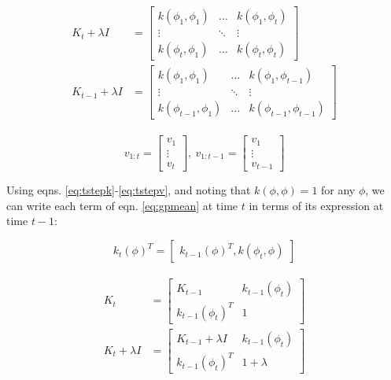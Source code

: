 \documentclass[letterpaper, 10 pt, conference]{ieeeconf}
\begin{document}
\begin{align}
\begin{split}
    K_t+\lambda I &= 
    \begin{bmatrix}
        k(\phi_1,\phi_1)&\hdots&k(\phi_1,\phi_t) \\
        \vdots & \ddots & \vdots \\
        k(\phi_t,\phi_1)&\hdots&k(\phi_t,\phi_t)
    \end{bmatrix}
    \\
    K_{t-1}+\lambda I &= 
    \begin{bmatrix}
        k(\phi_1,\phi_1)&\hdots&k(\phi_1,\phi_{t-1}) \\
        \vdots & \ddots & \vdots \\
        k(\phi_{t-1},\phi_1)&\hdots&k(\phi_{t-1},\phi_{t-1})
    \end{bmatrix}
    \label{eq:tstepK}
\end{split}
\end{align}

\begin{equation}
    v_{1:t} = 
    \begin{bmatrix}
        v_1 \\
        \vdots \\
        v_t
    \end{bmatrix}
    ,\ 
    v_{1:t-1} = 
    \begin{bmatrix}
        v_1 \\
        \vdots \\
        v_{t-1}
    \end{bmatrix}
    \label{eq:tstepv}
\end{equation}
\smallskip

Using eqns. \ref{eq:tstepk}-\ref{eq:tstepv}, and noting that $k(\phi,\phi)=1$ for any $\phi$, we can write each term of eqn. \ref{eq:gpmean} at time $t$ in terms of its expression at time $t-1$:

\begin{equation}
    k_t(\phi)^T=
    \begin{bmatrix}
        k_{t-1}(\phi)^T, k(\phi_t,\phi)
    \end{bmatrix}
\end{equation}

\begin{align}
\begin{split}
    K_t &=
    \begin{bmatrix}
        K_{t-1} & k_{t-1}(\phi_t) \\
        k_{t-1}(\phi_t)^T & 1
    \end{bmatrix}
    \\
    K_t+\lambda I &=
    \begin{bmatrix}
        K_{t-1}+\lambda I & k_{t-1}(\phi_t) \\
        k_{t-1}(\phi_t)^T & 1 + \lambda
    \end{bmatrix}
\end{split}
\end{align}
\end{document}
